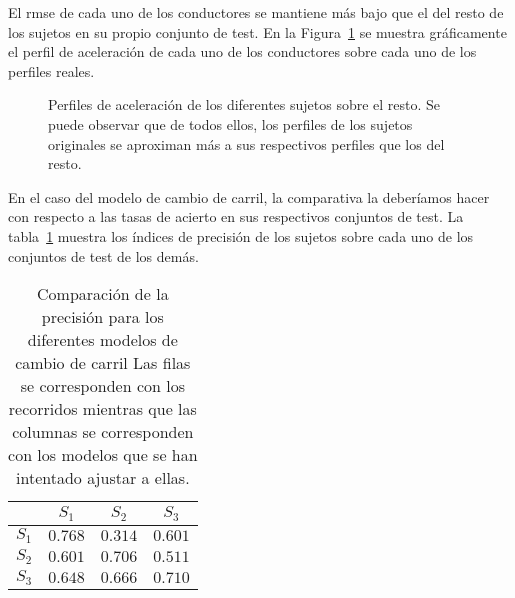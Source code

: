 El \ac{rmse} de cada uno de los conductores se mantiene más bajo que el del resto de los sujetos en su propio conjunto de test. En la Figura~\ref{fig:lm-subjects-comparison} se muestra gráficamente el perfil de aceleración de cada uno de los conductores sobre cada uno de los perfiles reales.

\begin{figure}[t]
	\centering
	\qquad
	\qquad
	\caption[Perfiles de aceleración de los diferentes sujetos sobre el resto]{Perfiles de aceleración de los diferentes sujetos sobre el resto. Se puede observar que de todos ellos, los perfiles de los sujetos originales se aproximan más a sus respectivos perfiles que los del resto.}
	\label{fig:lm-subjects-comparison}
\end{figure}

En el caso del modelo de cambio de carril, la comparativa la deberíamos hacer con respecto a las tasas de acierto en sus respectivos conjuntos de test. La tabla~\ref{tbl:lc-subjects-comparison} muestra los índices de precisión de los sujetos sobre cada uno de los conjuntos de test de los demás.

\begin{table}
	\centering
	\caption[Comparación de la precisión para los diferentes modelos de cambio de carril]{Comparación de la precisión para los diferentes modelos de cambio de carril Las filas se corresponden con los recorridos mientras que las columnas se corresponden con los modelos que se han intentado ajustar a ellas.}
	\label{tbl:lc-subjects-comparison}
	\begin{tabular}{c|ccc}
		& \textbf{$S_1$} & \textbf{$S_2$} & \textbf{$S_3$} \\ \hline
		\textbf{$S_1$} & $0.768$ & $0.314$ & $0.601$ \\
		\textbf{$S_2$} & $0.601$ & $0.706$ & $0.511$ \\
		\textbf{$S_3$} & $0.648$ & $0.666$ & $0.710$ \\ \hline
	\end{tabular}
\end{table}